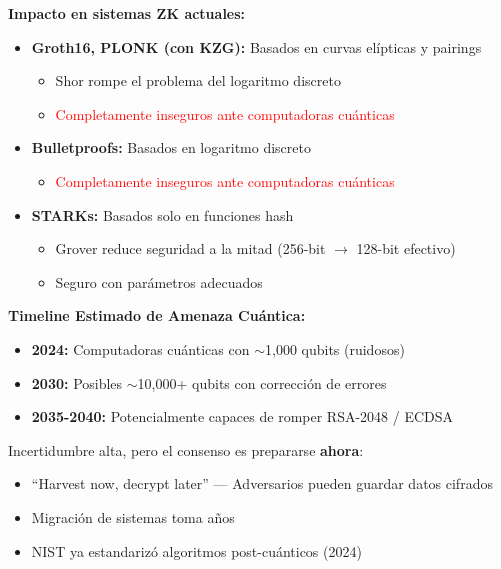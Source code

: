 \documentclass[11pt,a4paper,twoside]{book}
\begin{document}
\begin{remark}
\textbf{Impacto en sistemas ZK actuales:}

\begin{itemize}
    \item \textbf{Groth16, PLONK (con KZG):} Basados en curvas el\'ipticas y pairings
    \begin{itemize}
        \item Shor rompe el problema del logaritmo discreto
        \item \textcolor{red}{Completamente inseguros ante computadoras cu\'anticas}
    \end{itemize}
    
    \item \textbf{Bulletproofs:} Basados en logaritmo discreto
    \begin{itemize}
        \item \textcolor{red}{Completamente inseguros ante computadoras cu\'anticas}
    \end{itemize}
    
    \item \textbf{STARKs:} Basados solo en funciones hash
    \begin{itemize}
        \item Grover reduce seguridad a la mitad (256-bit $\to$ 128-bit efectivo)
        \item \textcolor{green!50!black}{Seguro con par\'ametros adecuados}
    \end{itemize}
\end{itemize}
\end{remark}

\begin{mathnote}
\textbf{Timeline Estimado de Amenaza Cu\'antica:}
\begin{itemize}
    \item \textbf{2024:} Computadoras cu\'anticas con $\sim$1,000 qubits (ruidosos)
    \item \textbf{2030:} Posibles $\sim$10,000+ qubits con correcci\'on de errores
    \item \textbf{2035-2040:} Potencialmente capaces de romper RSA-2048 / ECDSA
\end{itemize}

Incertidumbre alta, pero el consenso es prepararse \textbf{ahora}:
\begin{itemize}
    \item ``Harvest now, decrypt later'' --- Adversarios pueden guardar datos cifrados
    \item Migraci\'on de sistemas toma a\~nos
    \item NIST ya estandariz\'o algoritmos post-cu\'anticos (2024)
\end{itemize}
\end{mathnote}
\end{document}
